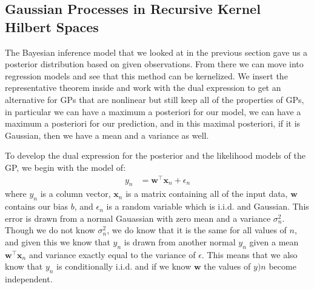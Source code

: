 \documentclass[journal]{IEEEtran}
\begin{document}
\subsection{Gaussian Processes in Recursive Kernel Hilbert Spaces}

The Bayesian inference model that we looked at in the previous section gave us a posterior distribution based on given observations. From there we can move into regression models and see that this method can be kernelized. We insert the representative theorem inside and work with the dual expression to get an alternative for GPs that are nonlinear but still keep all of the properties of GPs, in particular we can have a maximum a posteriori for our model, we can have a maximum a posteriori for our prediction, and in this maximal posteriori, if it is Gaussian, then we have a mean and a variance as well.

To develop the dual expression for the posterior and the likelihood models of the GP, we begin with the model of:
\begin{align}
    y_n &= \mathbf{w}^\top \mathbf{x}_n + \epsilon_n
\end{align}
where \(y_n\) is a column vector, \(\mathbf{x}_n\) is a matrix containing all of the input data, \(\mathbf{w}\) contains our bias \(b\), and \(\epsilon_n\) is a random variable which is i.i.d. and Gaussian. This error is drawn from a normal Gauassian with zero mean and a variance \(\sigma_n^2\). Though we do not know \(\sigma_n^2\), we do know that it is the same for all values of \(n\), and given this we know that \(y_n\) is drawn from another normal \(y_n\) given a mean \(\mathbf{w}^\top \mathbf{x}_n\) and variance exactly equal to the variance of \(\epsilon\). This means that we also know that \(y_n\) is conditionally i.i.d. and if we know \(\mathbf{w}\) the values of \(y)n\) become independent.
\end{document}
